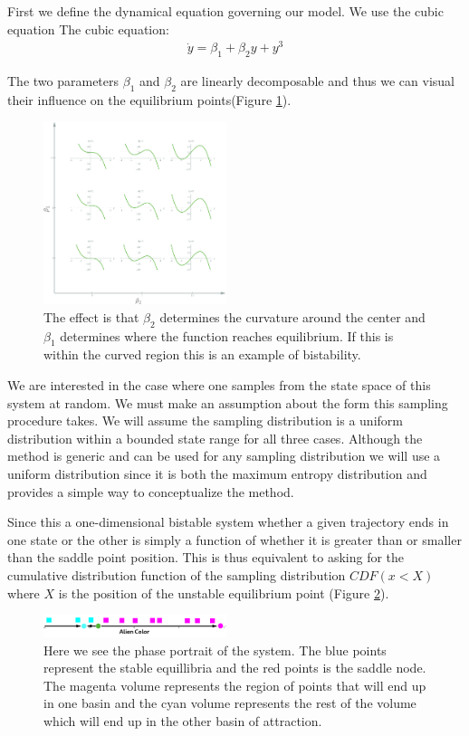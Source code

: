 \documentclass[letterpaper]{article}
\begin{document}
First we define the dynamical equation governing our model. We use
the cubic equation The cubic equation:
\begin{eqnarray}
    \dot{y} = \beta_1 + \beta_2 y + y^3
\end{eqnarray}

The two parameters $\beta_1$ and $\beta_2$ are linearly decomposable and thus
we can visual their influence on the equilibrium points(Figure \ref{fig1}).
\begin{figure}[t]
\begin{center}
\includegraphics[width=2.1in,angle=0]{./cubic_params.png}
\caption{The effect is that $\beta_2$ determines the curvature around the center
and $\beta_1$ determines where the function reaches equilibrium.
If this is within the curved region this is an example of bistability.}
\label{fig1}
\end{center}
\end{figure}

We are interested in the case where one samples from the state space of
this system at random. We must make an assumption about the form this sampling
procedure takes. We will assume the sampling distribution is a 
uniform distribution within a bounded state range for all three cases. 
Although the method is generic and can
be used for any sampling distribution we will use a uniform distribution 
since it is both the maximum entropy distribution and provides a simple 
way to conceptualize the method.

Since this a one-dimensional bistable system whether a given trajectory ends
in one state or the other is simply a function of whether it is greater than
or smaller than the saddle point position. This is thus equivalent to asking for the
cumulative distribution function of the sampling distribution $CDF(x<X)$ where
$X$ is the position of the unstable equilibrium point (Figure \ref{fig2}).

\begin{figure}[t]
\begin{center}
\includegraphics[width=2.1in,angle=0]{./basins.png}
\caption{Here we see the phase portrait of the system. The blue points represent
the stable equillibria and the red points is the saddle node. The magenta volume
represents the region of points that will end up in one basin and the cyan volume
represents the rest of the volume which will end up in the other basin of attraction.}

\label{fig2}
\end{center}
\end{figure}
\end{document}

